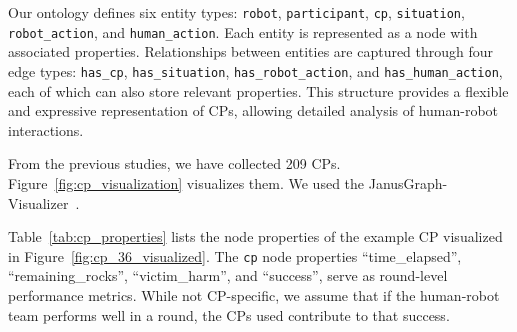 \documentclass[letterpaper]{article} %
\begin{document}
Our ontology defines six entity types: \texttt{robot}, \texttt{participant}, \texttt{cp}, \texttt{situation}, \texttt{robot\_action}, and \texttt{human\_action}. Each entity is represented as a node with associated properties. Relationships between entities are captured through four edge types: \texttt{has\_cp}, \texttt{has\_situation}, \texttt{has\_robot\_action}, and \texttt{has\_human\_action}, each of which can also store relevant properties. This structure provides a flexible and expressive representation of CPs, allowing detailed analysis of human-robot interactions.

From the previous studies, we have collected 209 CPs. Figure~\ref{fig:cp_visualization} visualizes them. We used the JanusGraph-Visualizer~\cite{janusgraph_2024}. 


Table~\ref{tab:cp_properties} lists the node properties of the example CP visualized in Figure~\ref{fig:cp_36_visualized}. The \texttt{cp} node properties ``time\_elapsed'', ``remaining\_rocks'', ``victim\_harm'', and ``success'', serve as round-level performance metrics. While not CP-specific, we assume that if the human-robot team performs well in a round, the CPs used contribute to that success.
\end{document}
